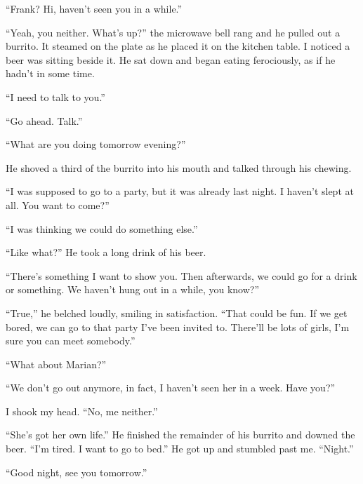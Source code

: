 ``Frank? Hi, haven't seen you in a while.''

``Yeah, you neither. What's up?'' the microwave bell rang and he pulled
out a burrito. It steamed on the plate as he placed it on the kitchen
table. I noticed a beer was sitting beside it. He sat down and began
eating ferociously, as if he hadn't in some time.

``I need to talk to you.''

``Go ahead. Talk.''

``What are you doing tomorrow evening?''

He shoved a third of the burrito into his mouth and talked through his
chewing.

``I was supposed to go to a party, but it was already last night. I
haven't slept at all. You want to come?''

``I was thinking we could do something else.''

``Like what?'' He took a long drink of his beer.

``There's something I want to show you. Then afterwards, we could go for
a drink or something. We haven't hung out in a while, you know?''

``True,'' he belched loudly, smiling in satisfaction. ``That could be
fun. If we get bored, we can go to that party I've been invited to.
There'll be lots of girls, I'm sure you can meet somebody.''

``What about Marian?''

``We don't go out anymore, in fact, I haven't seen her in a week. Have
you?''

I shook my head. ``No, me neither.''

``She's got her own life.'' He finished the remainder of his burrito and
downed the beer. ``I'm tired. I want to go to bed.'' He got up and
stumbled past me. ``Night.''

``Good night, see you tomorrow.''

